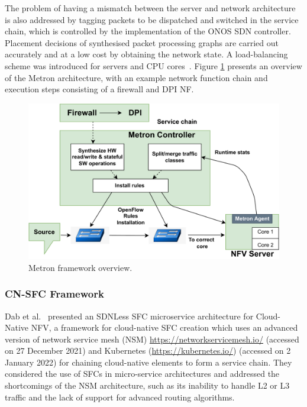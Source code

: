 \documentclass[futureinternet,review,accept,pdftex,moreauthors]{Definitions/mdpi}
\begin{document}
The problem of having a mismatch between the server and network architecture is also addressed by tagging packets to be dispatched and switched in the service chain, which is controlled by the implementation of the ONOS SDN controller. Placement decisions of synthesised packet processing graphs are carried out accurately and at a low cost by obtaining the network state. A load-balancing scheme was introduced for servers and CPU cores~\cite{katsikas2018metron}. Figure \ref{Metron-figure} presents an overview of the Metron architecture, with an example network function chain and execution steps consisting of a firewall and DPI NF.

\begin{figure}[H]%
\includegraphics[width=0.8\columnwidth]{Metron.pdf}
\caption{Metron framework overview.}
\label{Metron-figure}
\end{figure}


\subsubsection{CN-SFC Framework}
\label{CN-SFC}
Dab {et al.}~\cite{dab2020efficient} presented an SDNLess SFC microservice architecture for Cloud-Native NFV, a framework for cloud-native SFC creation which uses an advanced version of network service mesh (NSM) {\url{https://networkservicemesh.io/}} ({accessed} %
on 27 December 2021) and Kubernetes {(\url {https://kubernetes.io/})} ({accessed} %
on 2 January 2022) for chaining cloud-native elements to form a service chain. They considered the use of SFCs in micro-service architectures and addressed the shortcomings of the NSM architecture, such as its inability to handle L2 or L3 traffic and the lack of support for advanced routing algorithms.
\end{document}
